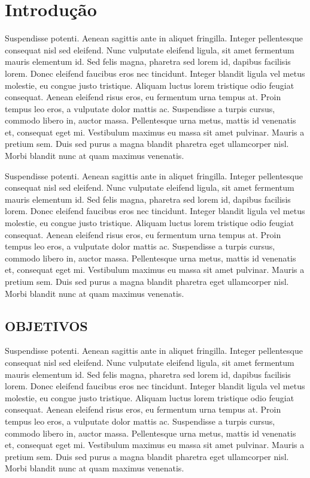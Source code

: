 \chapter{Introdução}
Suspendisse potenti. Aenean sagittis ante in aliquet fringilla. Integer pellentesque consequat nisl sed eleifend. Nunc vulputate eleifend ligula, sit amet fermentum mauris elementum id. Sed felis magna, pharetra sed lorem id, dapibus facilisis lorem. Donec eleifend faucibus eros nec tincidunt. Integer blandit ligula vel metus molestie, eu congue justo tristique. Aliquam luctus lorem tristique odio feugiat consequat. Aenean eleifend risus eros, eu fermentum urna tempus at. Proin tempus leo eros, a vulputate dolor mattis ac. Suspendisse a turpis cursus, commodo libero in, auctor massa. Pellentesque urna metus, mattis id venenatis et, consequat eget mi. Vestibulum maximus eu massa sit amet pulvinar. Mauris a pretium sem. Duis sed purus a magna blandit pharetra eget ullamcorper nisl. Morbi blandit nunc at quam maximus venenatis.

Suspendisse potenti. Aenean sagittis ante in aliquet fringilla. Integer pellentesque consequat nisl sed eleifend. Nunc vulputate eleifend ligula, sit amet fermentum mauris elementum id. Sed felis magna, pharetra sed lorem id, dapibus facilisis lorem. Donec eleifend faucibus eros nec tincidunt. Integer blandit ligula vel metus molestie, eu congue justo tristique. Aliquam luctus lorem tristique odio feugiat consequat. Aenean eleifend risus eros, eu fermentum urna tempus at. Proin tempus leo eros, a vulputate dolor mattis ac. Suspendisse a turpis cursus, commodo libero in, auctor massa. Pellentesque urna metus, mattis id venenatis et, consequat eget mi. Vestibulum maximus eu massa sit amet pulvinar. Mauris a pretium sem. Duis sed purus a magna blandit pharetra eget ullamcorper nisl. Morbi blandit nunc at quam maximus venenatis.

\section{OBJETIVOS}
Suspendisse potenti. Aenean sagittis ante in aliquet fringilla. Integer pellentesque consequat nisl sed eleifend. Nunc vulputate eleifend ligula, sit amet fermentum mauris elementum id. Sed felis magna, pharetra sed lorem id, dapibus facilisis lorem. Donec eleifend faucibus eros nec tincidunt. Integer blandit ligula vel metus molestie, eu congue justo tristique. Aliquam luctus lorem tristique odio feugiat consequat. Aenean eleifend risus eros, eu fermentum urna tempus at. Proin tempus leo eros, a vulputate dolor mattis ac. Suspendisse a turpis cursus, commodo libero in, auctor massa. Pellentesque urna metus, mattis id venenatis et, consequat eget mi. Vestibulum maximus eu massa sit amet pulvinar. Mauris a pretium sem. Duis sed purus a magna blandit pharetra eget ullamcorper nisl. Morbi blandit nunc at quam maximus venenatis.

